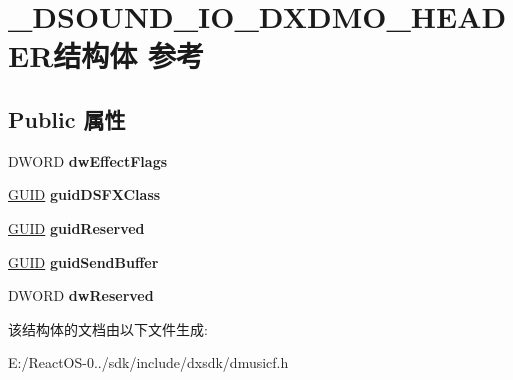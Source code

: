 \hypertarget{struct___d_s_o_u_n_d___i_o___d_x_d_m_o___h_e_a_d_e_r}{}\section{\+\_\+\+D\+S\+O\+U\+N\+D\+\_\+\+I\+O\+\_\+\+D\+X\+D\+M\+O\+\_\+\+H\+E\+A\+D\+E\+R结构体 参考}
\label{struct___d_s_o_u_n_d___i_o___d_x_d_m_o___h_e_a_d_e_r}
\subsection*{Public 属性}
\begin{DoxyCompactItemize}
\item 
\mbox{\label{struct___d_s_o_u_n_d___i_o___d_x_d_m_o___h_e_a_d_e_r_a019372ef9b7cb1a63882124dcdcb6848}} 
D\+W\+O\+RD {\bfseries dw\+Effect\+Flags}
\item 
\mbox{\label{struct___d_s_o_u_n_d___i_o___d_x_d_m_o___h_e_a_d_e_r_aae255d3303a9dbbe64429aef6a2cc243}} 
\hyperlink{interface_g_u_i_d}{G\+U\+ID} {\bfseries guid\+D\+S\+F\+X\+Class}
\item 
\mbox{\label{struct___d_s_o_u_n_d___i_o___d_x_d_m_o___h_e_a_d_e_r_aef9acfa1734a68f7caa0d0f727f86e92}} 
\hyperlink{interface_g_u_i_d}{G\+U\+ID} {\bfseries guid\+Reserved}
\item 
\mbox{\label{struct___d_s_o_u_n_d___i_o___d_x_d_m_o___h_e_a_d_e_r_a80299af053664ac37e78f409691bda51}} 
\hyperlink{interface_g_u_i_d}{G\+U\+ID} {\bfseries guid\+Send\+Buffer}
\item 
\mbox{\label{struct___d_s_o_u_n_d___i_o___d_x_d_m_o___h_e_a_d_e_r_a221f71fd05387f73bbe08b7765ab435e}} 
D\+W\+O\+RD {\bfseries dw\+Reserved}
\end{DoxyCompactItemize}


该结构体的文档由以下文件生成\+:\begin{DoxyCompactItemize}
\item 
E\+:/\+React\+O\+S-\/0../sdk/include/dxsdk/dmusicf.\+h\end{DoxyCompactItemize}
